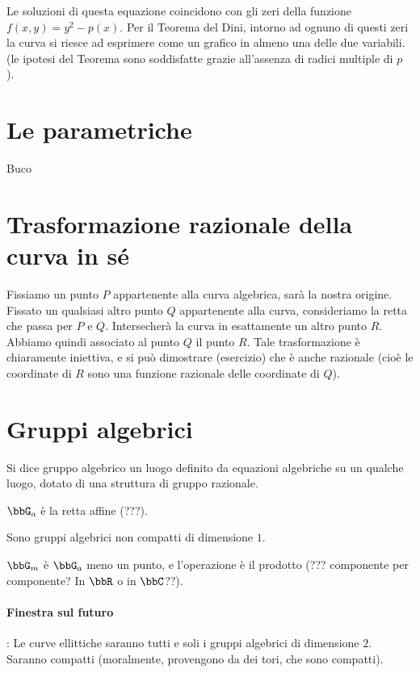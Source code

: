 Le soluzioni di questa equazione coincidono con 
gli zeri della funzione $f \left( x,y \right) = y^2 - p \left( x \right)$.
Per il Teorema del Dini, intorno ad ognuno di questi zeri la curva si riesce ad esprimere come un grafico in almeno una delle due variabili.
(le ipotesi del Teorema sono soddisfatte grazie all'assenza di radici multiple di $p$ ).


\section{Le parametriche}
Buco

\section{Trasformazione razionale della curva in sé}
Fissiamo un punto $P$ appartenente alla curva algebrica, sarà la nostra origine. Fissato un qualsiasi altro punto $Q$
appartenente alla curva, consideriamo la retta che passa per $P$ e $Q$. Intersecherà la curva in esattamente un altro punto $R$.
Abbiamo quindi associato al punto $Q$ il punto $R$. Tale trasformazione è chiaramente iniettiva, e si può dimostrare (esercizio)
che è anche razionale (cioè le coordinate di $R$ sono una funzione razionale delle coordinate di $Q$).

\section{Gruppi algebrici}
\begin{definizione}
Si dice gruppo algebrico un luogo definito da equazioni algebriche 
su un qualche luogo, dotato di una struttura di gruppo razionale.
\end{definizione}

\begin{definizione}
$\bbG_a$ è la retta affine (???).
\end{definizione}

\begin{osservazione}
Sono gruppi algebrici non compatti di dimensione $1$.
\end{osservazione}

\begin{definizione}
$\bbG_m$ è $\bbG_a$ meno un punto, e l'operazione è il prodotto (??? componente per componente?
In $\bbR$ o in $\bbC$??).
\end{definizione}


\paragraph{Finestra sul futuro}:
Le curve ellittiche saranno tutti e soli i gruppi algebrici di dimensione $2$. Saranno compatti
(moralmente, provengono da dei tori, che sono compatti).


